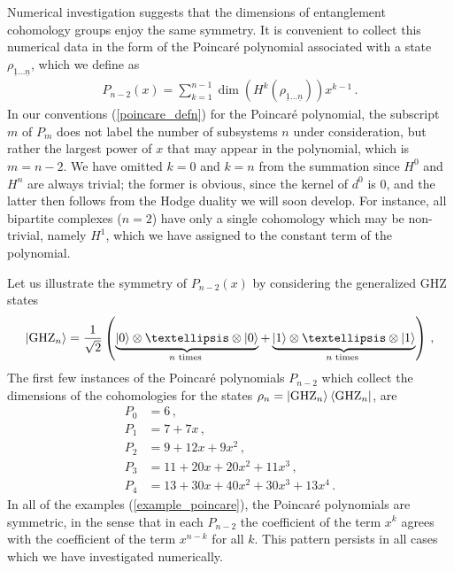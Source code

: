 \documentclass[12pt]{article}
\newcommand{\ul}[1]{{\underline{#1}}}
\numberwithin{equation}{section}
\newcommand{\rhooneton}{{\rho_{\ul{1} \ldots \ul{n}}}}
\begin{document}
Numerical investigation suggests that the dimensions of entanglement cohomology groups enjoy the same symmetry. It is convenient to collect this numerical data in the form of the Poincar\'e polynomial associated with a state $\rhooneton$, which we define as
%
\begin{align}\label{poincare_defn}
    P_{n - 2} ( x ) = \sum_{k = 1}^{n - 1} \dim \left( H^k \left( \rhooneton \right) \right) x^{k - 1} \, .
\end{align}
%
In our conventions (\ref{poincare_defn}) for the Poincar\'e polynomial, the subscript $m$ of $P_m$ does not label the number of subsystems $n$ under consideration, but rather the largest power of $x$ that may appear in the polynomial, which is $m = n - 2$. We have omitted $k = 0$ and $k = n$ from the summation since $H^0$ and $H^n$ are always trivial; the former is obvious, since the kernel of $d^0$ is $0$, and the latter then follows from the Hodge duality we will soon develop. For instance, all bipartite complexes ($n = 2$) have only a single cohomology which may be non-trivial, namely $H^1$, which we have assigned to the constant term of the polynomial. 

Let us illustrate the symmetry of $P_{n-2} ( x )$ by considering the generalized GHZ states
%
\begin{align}
    \ket{ \mathrm{GHZ}_{n} } = \frac{1}{\sqrt{2}} \left( \underbrace{\ket{0} \otimes \ldots \otimes \ket{0}}_{n \text{ times } } + \underbrace{\ket{1} \otimes \ldots \otimes \ket{1}}_{n \text{ times } } \right) \, ,
\end{align}
%
The first few instances of the Poincar\'e polynomials $P_{n-2}$ which collect the dimensions of the cohomologies for the states $\rho_{n} = \ket{ \mathrm{GHZ}_{n} } \bra{ \mathrm{GHZ}_{n} }$, are
%
\begin{align}\label{example_poincare}
    P_{0} &= 6 \, , \nonumber \\
    P_{1} &= 7 + 7 x \, , \nonumber \\
    P_{2} &= 9 + 12 x + 9 x^2 \, , \nonumber \\
    P_{3} &= 11 + 20 x + 20 x^2 + 11 x^3 \, , \nonumber \\
    P_{4} &= 13 + 30 x + 40 x^2 + 30 x^3 + 13 x^4 \, .
\end{align}
%
In all of the examples (\ref{example_poincare}), the Poincar\'e polynomials are symmetric, in the sense that in each $P_{n-2}$ the coefficient of the term $x^k$ agrees with the coefficient of the term $x^{n-k}$ for all $k$. This pattern persists in all cases which we have investigated numerically.
\end{document}
